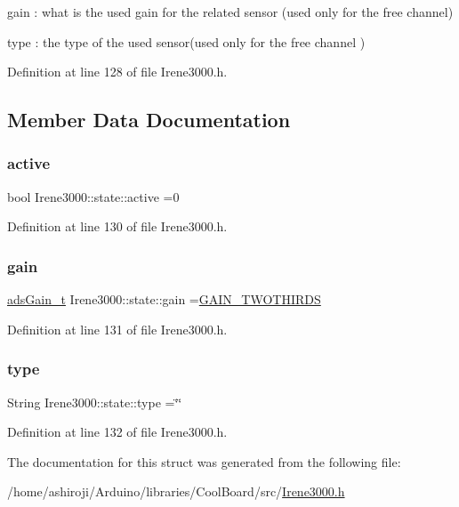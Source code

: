 gain \+: what is the used gain for the related sensor (used only for the free channel)

type \+: the type of the used sensor(used only for the free channel ) 

Definition at line 128 of file Irene3000.\+h.



\subsection{Member Data Documentation}
\mbox{\label{struct_irene3000_1_1state_a879828ace7e7a7bc91ff703bfee36599}} 
\subsubsection{\texorpdfstring{active}{active}}
{\footnotesize\ttfamily bool Irene3000\+::state\+::active =0}



Definition at line 130 of file Irene3000.\+h.

\mbox{\label{struct_irene3000_1_1state_a1ecf69d38cb31ecaf6b3602a3f3e93cb}} 
\subsubsection{\texorpdfstring{gain}{gain}}
{\footnotesize\ttfamily \hyperlink{_cool_adafruit___a_d_s1015_8h_a3d6c0e15829a207b9155890811fa4781}{ads\+Gain\+\_\+t} Irene3000\+::state\+::gain =\hyperlink{_cool_adafruit___a_d_s1015_8h_a3d6c0e15829a207b9155890811fa4781a879d688347ec0bf159fe1278db602f68}{G\+A\+I\+N\+\_\+\+T\+W\+O\+T\+H\+I\+R\+DS}}



Definition at line 131 of file Irene3000.\+h.

\mbox{\label{struct_irene3000_1_1state_a9897a7e02727db6351d44006eec73799}} 
\subsubsection{\texorpdfstring{type}{type}}
{\footnotesize\ttfamily String Irene3000\+::state\+::type =\char`\"{}\char`\"{}}



Definition at line 132 of file Irene3000.\+h.



The documentation for this struct was generated from the following file\+:\begin{DoxyCompactItemize}
\item 
/home/ashiroji/\+Arduino/libraries/\+Cool\+Board/src/\hyperlink{_irene3000_8h}{Irene3000.\+h}\end{DoxyCompactItemize}
